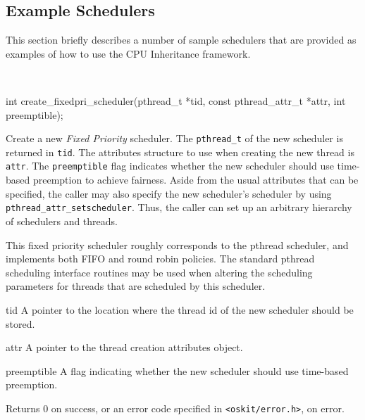 \subsection{Example Schedulers}
This section briefly describes a number of sample schedulers that are
provided as examples of how to use the CPU Inheritance framework.

\begin{apisyn}
	\\

	\funcproto int create_fixedpri_scheduler(pthread_t *tid,
			const pthread_attr_t *attr, int preemptible);
\end{apisyn}
\begin{apidesc}
	Create a new \emph{Fixed Priority} scheduler. The \texttt{pthread_t}
	of the new scheduler is returned in \texttt{tid}. The attributes
	structure to use when creating the new thread is \texttt{attr}. The
	\texttt{preemptible} flag indicates whether the new scheduler
	should use time-based preemption to achieve fairness.  Aside from
	the usual attributes that can be specified, the caller may also
	specify the new scheduler's scheduler by using
	\texttt{pthread_attr_setscheduler}. Thus, the caller can set up an
	arbitrary hierarchy of schedulers and threads.

	This fixed priority scheduler roughly corresponds to the \posix{}
	pthread scheduler, and implements both FIFO and round robin
	policies. The standard pthread scheduling interface routines may be
	used when altering the scheduling parameters for threads that are
	scheduled by this scheduler. 
\end{apidesc}
\begin{apiparm}
	\item[tid]
		A pointer to the location where the thread id of the new
		scheduler should be stored. 
	\item[attr]
		A pointer to the thread creation attributes object.
	\item[preemptible]
		A flag indicating whether the new scheduler should use
		time-based preemption.
\end{apiparm}
\begin{apiret}
	Returns 0 on success, or an error code specified in
	{\tt <oskit/error.h>}, on error.
\end{apiret}


